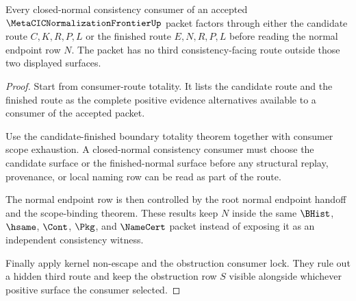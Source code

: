 \begin{theorem}
\label{thm:metacic-normalization-frontier-consistency-consumer-factorization}
Every closed-normal consistency consumer of an accepted
$\MetaCICNormalizationFrontierUp$ packet factors through either the candidate
route $C,K,R,P,L$ or the finished route $E,N,R,P,L$ before reading the normal
endpoint row $N$. The packet has no third consistency-facing route outside
those two displayed surfaces.
\end{theorem}
\begin{proof}
Start from consumer-route totality. It lists the candidate route and the
finished route as the complete positive evidence alternatives available to a
consumer of the accepted packet.

Use the candidate-finished boundary totality theorem together with consumer
scope exhaustion. A closed-normal consistency consumer must choose the
candidate surface or the finished-normal surface before any structural replay,
provenance, or local naming row can be read as part of the route.

The normal endpoint row is then controlled by the root normal endpoint handoff
and the scope-binding theorem. These results keep $N$ inside the same
$\BHist$, $\hsame$, $\Cont$, $\Pkg$, and $\NameCert$ packet instead of exposing
it as an independent consistency witness.

Finally apply kernel non-escape and the obstruction consumer lock. They rule
out a hidden third route and keep the obstruction row $S$ visible alongside
whichever positive surface the consumer selected.
\end{proof}

